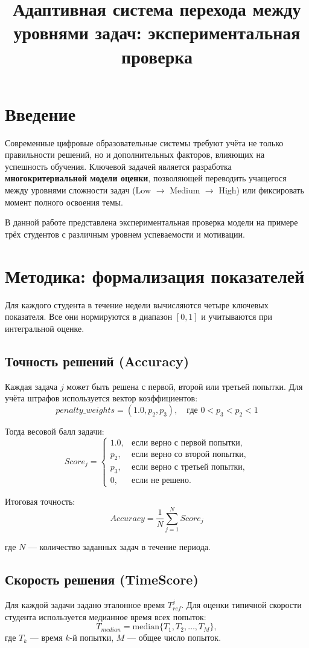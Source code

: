 \documentclass[12pt,a4paper]{article}
\title{Адаптивная система перехода между уровнями задач: экспериментальная проверка}
\author{ }
\date{}
\begin{document}
\maketitle

\section{Введение}
Современные цифровые образовательные системы требуют учёта не только правильности решений, но и дополнительных факторов, влияющих на успешность обучения. 
Ключевой задачей является разработка \textbf{многокритериальной модели оценки}, позволяющей переводить учащегося между уровнями сложности задач (Low $\rightarrow$ Medium $\rightarrow$ High) или фиксировать момент полного освоения темы.  

В данной работе представлена экспериментальная проверка модели на примере трёх студентов с различным уровнем успеваемости и мотивации.

\section{Методика: формализация показателей}

Для каждого студента в течение недели вычисляются четыре ключевых показателя.  
Все они нормируются в диапазон $[0,1]$ и учитываются при интегральной оценке.

\subsection{Точность решений (Accuracy)}
Каждая задача $j$ может быть решена с первой, второй или третьей попытки. 
Для учёта штрафов используется вектор коэффициентов:
\[
penalty\_weights = (1.0, p_2, p_3), \quad \text{где } 0 < p_3 < p_2 < 1
\]

Тогда весовой балл задачи:
\[
Score_j =
\begin{cases}
1.0, & \text{если верно с первой попытки}, \\
p_2, & \text{если верно со второй попытки}, \\
p_3, & \text{если верно с третьей попытки}, \\
0,   & \text{если не решено}.
\end{cases}
\]

Итоговая точность:
\[
Accuracy = \frac{1}{N} \sum_{j=1}^N Score_j
\]

где $N$ — количество заданных задач в течение периода.

\subsection{Скорость решения (TimeScore)}
Для каждой задачи задано эталонное время $T_{ref}^j$. 
Для оценки типичной скорости студента используется медианное время всех попыток:
\[
T_{median} = \text{median}\{T_1, T_2, \ldots, T_M\},
\]
где $T_k$ — время $k$-й попытки, $M$ — общее число попыток.
\end{document}
